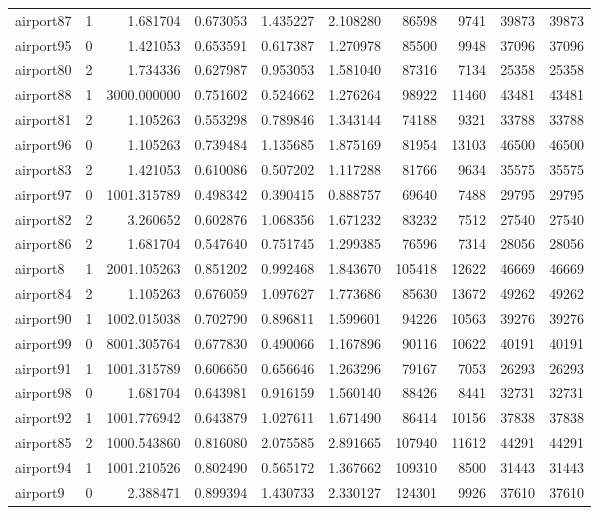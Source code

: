 \begin{longtable}{|l|r|r|r|r|r|r|r|r|r|}
airport87 & 1 & 1.681704 & 0.673053 & 1.435227 & 2.108280 & 86598 & 9741 & 39873 & 39873 \\
airport95 & 0 & 1.421053 & 0.653591 & 0.617387 & 1.270978 & 85500 & 9948 & 37096 & 37096 \\
airport80 & 2 & 1.734336 & 0.627987 & 0.953053 & 1.581040 & 87316 & 7134 & 25358 & 25358 \\
airport88 & 1 & 3000.000000 & 0.751602 & 0.524662 & 1.276264 & 98922 & 11460 & 43481 & 43481 \\
airport81 & 2 & 1.105263 & 0.553298 & 0.789846 & 1.343144 & 74188 & 9321 & 33788 & 33788 \\
airport96 & 0 & 1.105263 & 0.739484 & 1.135685 & 1.875169 & 81954 & 13103 & 46500 & 46500 \\
airport83 & 2 & 1.421053 & 0.610086 & 0.507202 & 1.117288 & 81766 & 9634 & 35575 & 35575 \\
airport97 & 0 & 1001.315789 & 0.498342 & 0.390415 & 0.888757 & 69640 & 7488 & 29795 & 29795 \\
airport82 & 2 & 3.260652 & 0.602876 & 1.068356 & 1.671232 & 83232 & 7512 & 27540 & 27540 \\
airport86 & 2 & 1.681704 & 0.547640 & 0.751745 & 1.299385 & 76596 & 7314 & 28056 & 28056 \\
airport8 & 1 & 2001.105263 & 0.851202 & 0.992468 & 1.843670 & 105418 & 12622 & 46669 & 46669 \\
airport84 & 2 & 1.105263 & 0.676059 & 1.097627 & 1.773686 & 85630 & 13672 & 49262 & 49262 \\
airport90 & 1 & 1002.015038 & 0.702790 & 0.896811 & 1.599601 & 94226 & 10563 & 39276 & 39276 \\
airport99 & 0 & 8001.305764 & 0.677830 & 0.490066 & 1.167896 & 90116 & 10622 & 40191 & 40191 \\
airport91 & 1 & 1001.315789 & 0.606650 & 0.656646 & 1.263296 & 79167 & 7053 & 26293 & 26293 \\
airport98 & 0 & 1.681704 & 0.643981 & 0.916159 & 1.560140 & 88426 & 8441 & 32731 & 32731 \\
airport92 & 1 & 1001.776942 & 0.643879 & 1.027611 & 1.671490 & 86414 & 10156 & 37838 & 37838 \\
airport85 & 2 & 1000.543860 & 0.816080 & 2.075585 & 2.891665 & 107940 & 11612 & 44291 & 44291 \\
airport94 & 1 & 1001.210526 & 0.802490 & 0.565172 & 1.367662 & 109310 & 8500 & 31443 & 31443 \\
airport9 & 0 & 2.388471 & 0.899394 & 1.430733 & 2.330127 & 124301 & 9926 & 37610 & 37610 \\

\end{longtable}
